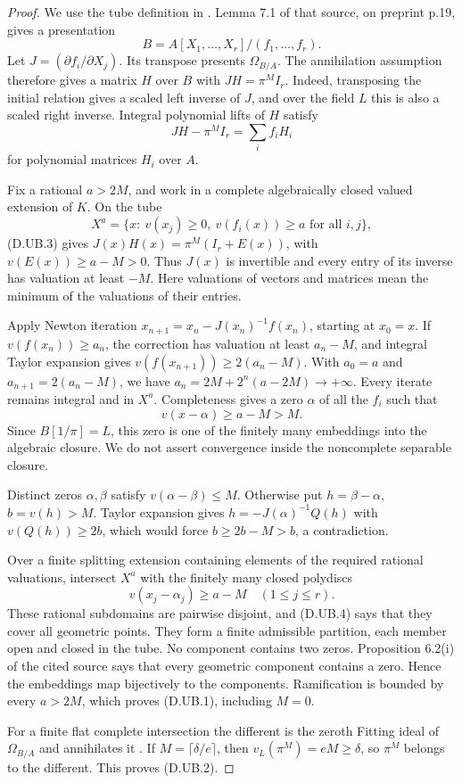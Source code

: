 \begin{proof}
We use the tube definition in \cite[sections 3.1 and 6,
Proposition 6.2(i), Definition 6.3 and Proposition 6.4,
preprint pp.5--6 and 15--16]{AbbesSaito2002D}.
Lemma 7.1 of that source, on preprint p.19, gives a presentation
\[
                 B=A[X_1,\ldots,X_r]/(f_1,\ldots,f_r).
\]
Let $J=(\partial f_i/\partial X_j)$. Its transpose presents
$\Omega_{B/A}$. The annihilation assumption therefore gives
a matrix $H$ over $B$ with $JH=\pi^M I_r$.
Indeed, transposing the initial relation gives a scaled left
inverse of $J$, and over the field $L$ this is also a scaled
right inverse. Integral polynomial lifts of $H$ satisfy
\[
                  JH-\pi^M I_r=\sum_i f_i H_i             \tag{D.UB.3}
\]
for polynomial matrices $H_i$ over $A$.

Fix a rational $a>2M$, and work in a complete algebraically
closed valued extension of $K$. On the tube
\[
 X^a=\{x:\ v(x_j)\geq0,\ v(f_i(x))\geq a\text{ for all }i,j\},
\]
(D.UB.3) gives $J(x)H(x)=\pi^M(I_r+E(x))$, with
$v(E(x))\geq a-M>0$. Thus $J(x)$ is invertible and every
entry of its inverse has valuation at least $-M$.
Here valuations of vectors and matrices mean the minimum
of the valuations of their entries.

Apply Newton iteration
$x_{n+1}=x_n-J(x_n)^{-1}f(x_n)$, starting at $x_0=x$.
If $v(f(x_n))\geq a_n$, the correction has valuation
at least $a_n-M$, and integral Taylor expansion gives
$v(f(x_{n+1}))\geq2(a_n-M)$.
With $a_0=a$ and $a_{n+1}=2(a_n-M)$, we have
$a_n=2M+2^n(a-2M)\to+\infty$. Every iterate remains integral
and in $X^a$. Completeness gives a zero $\alpha$ of all the
$f_i$ such that
\[
                          v(x-\alpha)\geq a-M>M.          \tag{D.UB.4}
\]
Since $B[1/\pi]=L$, this zero is one of the finitely many
embeddings into the algebraic closure. We do not assert
convergence inside the noncomplete separable closure.

Distinct zeros $\alpha,\beta$ satisfy
$v(\alpha-\beta)\leq M$. Otherwise put $h=\beta-\alpha$,
$b=v(h)>M$. Taylor expansion gives
$h=-J(\alpha)^{-1}Q(h)$ with $v(Q(h))\geq2b$, which would
force $b\geq2b-M>b$, a contradiction.

Over a finite splitting extension containing elements of
the required rational valuations, intersect $X^a$ with
the finitely many closed polydiscs
\[
                    v(x_j-\alpha_j)\geq a-M\quad(1\leq j\leq r).
\]
These rational subdomains are pairwise disjoint, and
(D.UB.4) says that they cover all geometric points.
They form a finite admissible partition, each member
open and closed in the tube. No component contains two
zeros. Proposition 6.2(i) of the cited source says that
every geometric component contains a zero. Hence the
embeddings map bijectively to the components. Ramification
is bounded by every $a>2M$, which proves (D.UB.1), including
$M=0$.

For a finite flat complete intersection the different is
the zeroth Fitting ideal of $\Omega_{B/A}$ and annihilates it
\cite[section 49.7 and Lemma 49.12.3, Tags 0BVV and 0BWB]{StacksDDifferent}.
If $M=\lceil\delta/e\rceil$, then $v_L(\pi^M)=eM\geq\delta$,
so $\pi^M$ belongs to the different. This proves (D.UB.2).
\end{proof}

